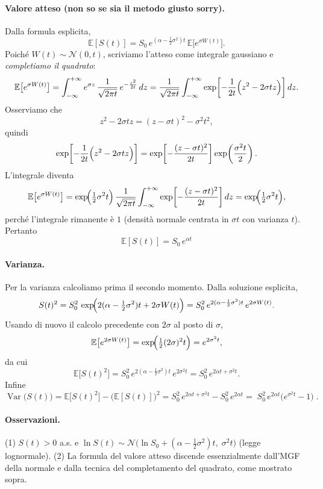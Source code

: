 \documentclass[12pt,a4paper]{book}
\theoremstyle{remark}
\begin{document}
\paragraph{Valore atteso (non so se sia il metodo giusto sorry).}
Dalla formula esplicita,
\[
\mathbb{E}[S(t)]=S_0\,e^{(\alpha-\frac{1}{2}\sigma^2)t}\,\mathbb{E}\big[e^{\sigma W(t)}\big].
\]
Poich\'e $W(t)\sim \mathcal{N}(0,t)$, scriviamo l’atteso come integrale gaussiano e \emph{completiamo il quadrato}:
\[
\mathbb{E}\big[e^{\sigma W(t)}\big]
=\int_{-\infty}^{+\infty} e^{\sigma z}\,\frac{1}{\sqrt{2\pi t}}\,e^{-\frac{z^2}{2t}}\,dz
=\frac{1}{\sqrt{2\pi t}}\int_{-\infty}^{+\infty}\exp\!\left[-\frac{1}{2t}\Bigl(z^2-2\sigma tz\Bigr)\right]dz.
\]
Osserviamo che
\[
z^2-2\sigma tz=(z-\sigma t)^2-\sigma^2 t^2,
\]
quindi
\[
\exp\!\left[-\frac{1}{2t}\Bigl(z^2-2\sigma tz\Bigr)\right]
=\exp\!\left[-\frac{(z-\sigma t)^2}{2t}\right]\exp\!\left(\frac{\sigma^2 t}{2}\right).
\]
L’integrale diventa
\[
\mathbb{E}\big[e^{\sigma W(t)}\big]
=\exp\!\Bigl(\tfrac{1}{2}\sigma^2 t\Bigr)\,\frac{1}{\sqrt{2\pi t}}
\int_{-\infty}^{+\infty}\exp\!\left[-\frac{(z-\sigma t)^2}{2t}\right]dz
=\exp\!\Bigl(\tfrac{1}{2}\sigma^2 t\Bigr),
\]
perch\'e l’integrale rimanente è $1$ (densità normale centrata in $\sigma t$ con varianza $t$).
Pertanto
\[
\boxed{\;\mathbb{E}[S(t)]=S_0\,e^{\alpha t}\;}
\]

\paragraph{Varianza.}
Per la varianza calcoliamo prima il secondo momento. Dalla soluzione esplicita,
\[
S(t)^2=S_0^2\,\exp\!\Bigl(2(\alpha-\tfrac{1}{2}\sigma^2)t+2\sigma W(t)\Bigr)
=S_0^2\,e^{2(\alpha-\frac{1}{2}\sigma^2)t}\,e^{2\sigma W(t)}.
\]
Usando di nuovo il calcolo precedente con $2\sigma$ al posto di $\sigma$,
\[
\mathbb{E}\big[e^{2\sigma W(t)}\big]=\exp\!\Bigl(\tfrac{1}{2}(2\sigma)^2 t\Bigr)=e^{2\sigma^2 t},
\]
da cui
\[
\mathbb{E}\big[S(t)^2\big]=S_0^2\,e^{2(\alpha-\frac{1}{2}\sigma^2)t}\,e^{2\sigma^2 t}
=S_0^2\,e^{2\alpha t+\sigma^2 t}.
\]
Infine
\[
\operatorname{Var}\big(S(t)\big)
=\mathbb{E}\big[S(t)^2\big]-\big(\mathbb{E}[S(t)]\big)^2
=S_0^2\,e^{2\alpha t+\sigma^2 t}-S_0^2\,e^{2\alpha t}
=\boxed{\;S_0^2\,e^{2\alpha t}\big(e^{\sigma^2 t}-1\big)\;}.
\]

\paragraph{Osservazioni.}
(1) $S(t)>0$ a.s. e $\ln S(t)\sim \mathcal{N}\!\bigl(\ln S_0+(\alpha-\tfrac{1}{2}\sigma^2)t,\;\sigma^2 t\bigr)$ (legge lognormale).
(2) La formula del valore atteso discende essenzialmente dall’MGF della normale e dalla tecnica del completamento del quadrato, come mostrato sopra.
\end{document}
